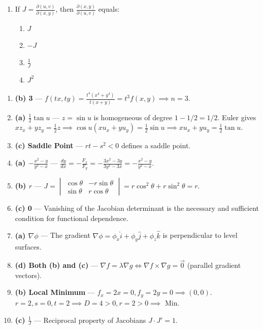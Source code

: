 \begin{enumerate}[leftmargin=1.5em]
    \item If $J = \frac{\partial(u,v)}{\partial(x,y)}$, then $\frac{\partial(x,y)}{\partial(u,v)}$ equals:
    \begin{enumerate}[label=(\alph*)]
        \item $J$
        \item $-J$
        \item $\frac{1}{J}$
        \item $J^2$
    \end{enumerate}
\end{enumerate}

\begin{solutionbox}
\begin{enumerate}
    \item \textbf{(b) 3} --- $f(tx,ty) = \frac{t^4(x^4+y^4)}{t(x+y)} = t^3 f(x,y) \implies n = 3$.
    \item \textbf{(a) $\frac{1}{2}\tan u$} --- $z = \sin u$ is homogeneous of degree $1 - 1/2 = 1/2$. Euler gives $x z_x + y z_y = \frac{1}{2}z \implies \cos u (x u_x + y u_y) = \frac{1}{2}\sin u \implies x u_x + y u_y = \frac{1}{2}\tan u$.
    \item \textbf{(c) Saddle Point} --- $rt - s^2 < 0$ defines a saddle point.
    \item \textbf{(a) $-\frac{x^2 - y}{y^2 - x}$} --- $\frac{dy}{dx} = -\frac{F_x}{F_y} = -\frac{3x^2-3y}{3y^2-3x} = -\frac{x^2-y}{y^2-x}$.
    \item \textbf{(b) $r$} --- $J = \begin{vmatrix} \cos\theta & -r\sin\theta \\ \sin\theta & r\cos\theta \end{vmatrix} = r\cos^2\theta + r\sin^2\theta = r$.
    \item \textbf{(c) 0} --- Vanishing of the Jacobian determinant is the necessary and sufficient condition for functional dependence.
    \item \textbf{(a) $\nabla\phi$} --- The gradient $\nabla\phi = \phi_x\hat{i} + \phi_y\hat{j} + \phi_z\hat{k}$ is perpendicular to level surfaces.
    \item \textbf{(d) Both (b) and (c)} --- $\nabla f = \lambda \nabla g \iff \nabla f \times \nabla g = \vec{0}$ (parallel gradient vectors).
    \item \textbf{(b) Local Minimum} --- $f_x=2x=0, f_y=2y=0 \implies (0,0)$. $r=2, s=0, t=2 \implies D = 4 > 0, r=2 > 0 \implies$ Min.
    \item \textbf{(c) $\frac{1}{J}$} --- Reciprocal property of Jacobians $J \cdot J' = 1$.
\end{enumerate}
\end{solutionbox}

